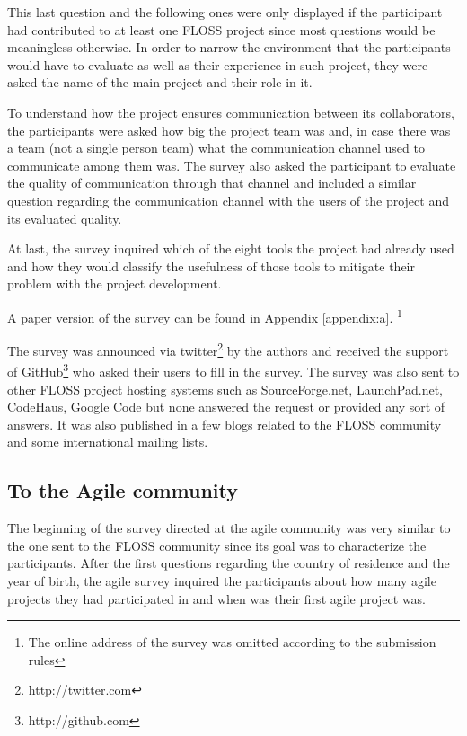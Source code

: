 \documentclass[lnbip]{svmultln}
\newcommand{\footnoteremember}[2]{
  \footnote{#2}
  \newcounter{#1}
  \setcounter{#1}{\value{footnote}}
}
\begin{document}
This last question and the following ones were only displayed if the
participant had contributed to at least one FLOSS project since most
questions would be meaningless otherwise. In order to narrow the
environment that the participants would have to evaluate as well as
their experience in such project, they were asked the name of the main
project and their role in it.

To understand how the project ensures communication between its
collaborators, the participants were asked how big the project team
was and, in case there was a team (not a single person team) what the
communication channel used to communicate among them was. The survey
also asked the participant to evaluate the quality of communication
through that channel and included a similar question regarding the
communication channel with the users of the project and its evaluated
quality.

At last, the survey inquired which of the eight tools the project had
already used and how they would classify the usefulness of those tools
to mitigate their problem with the project development.

A paper version of the survey can be found in Appendix
\ref{appendix:a}.\footnoteremember{onlineoff}{The online address of
  the survey was omitted according to the submission rules}

The survey was announced via twitter\footnote{http://twitter.com} by
the authors and received the support of
GitHub\footnote{http://github.com} who asked their users to fill in
the survey.  The survey was also sent to other FLOSS project hosting
systems such as SourceForge.net, LaunchPad.net, CodeHaus, Google Code
but none answered the request or provided any sort of answers. It was
also published in a few blogs related to the FLOSS community and some
international mailing lists.

\subsection{To the Agile community}
\label{subsec:agile-survey}

The beginning of the survey directed at the agile community was very
similar to the one sent to the FLOSS community since its goal was to
characterize the participants.  After the first questions regarding
the country of residence and the year of birth, the agile survey
inquired the participants about how many agile projects they had
participated in and when was their first agile project was.
\end{document}
